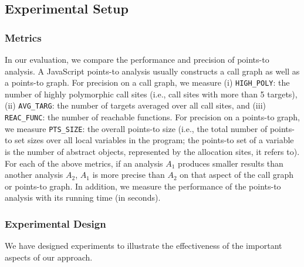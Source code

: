 \subsection{Experimental Setup} 

\subsubsection{Metrics}

In our evaluation, we compare the performance and precision of points-to analysis. A JavaScript points-to analysis usually constructs a call graph as well as a points-to graph. For precision on a call graph, we measure (i) {\tt HIGH\_POLY}: the number of highly polymorphic call sites (i.e., call sites with more than 5 targets), (ii) {\tt AVG\_TARG}: the number of targets averaged over all call sites, and (iii) {\tt REAC\_FUNC}: the number of reachable functions. For precision on a points-to graph, we measure {\tt PTS\_SIZE}: the overall points-to size (i.e., the total number of points-to set sizes over all local variables in the program; the points-to set of a variable is the number of abstract objects, represented by the allocation sites, it refers to). For each of the above metrics, if an analysis $A_1$ produces smaller results than another analysis $A_2$, $A_1$ is more precise than $A_2$ on that aspect of the call graph or points-to graph. In addition, we measure the performance of the points-to analysis with its running time (in seconds).



\subsubsection{Experimental Design} 
We have designed experiments to illustrate the effectiveness of the important aspects of our approach.

